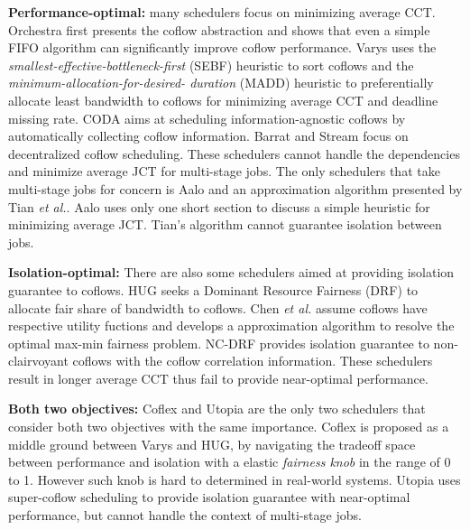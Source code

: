 \documentclass[10pt, conference, letterpaper]{IEEEtran}
\begin{document}
\noindent\textbf{Performance-optimal:} many schedulers focus on minimizing average CCT. Orchestra\cite{orchestra} first presents the coflow abstraction and shows that even a simple FIFO algorithm can significantly improve coflow performance. Varys\cite{varys} uses the \emph{smallest-effective-bottleneck-first} (SEBF) heuristic to sort coflows and the \emph{minimum-allocation-for-desired- duration} (MADD) heuristic to preferentially allocate least bandwidth to coflows for minimizing average CCT and deadline missing rate. CODA\cite{coda} aims at scheduling information-agnostic coflows by automatically collecting coflow information. Barrat\cite{barrat} and Stream\cite{stream} focus on decentralized coflow scheduling. These schedulers cannot handle the dependencies and minimize average JCT for multi-stage jobs. The only schedulers that take multi-stage jobs for concern is Aalo\cite{aalo} and an approximation algorithm presented by Tian \emph{et al.}\cite{bingchuan}. Aalo uses only one short section to discuss a simple heuristic for minimizing average JCT. Tian's algorithm cannot guarantee isolation between jobs.

\noindent\textbf{Isolation-optimal:} There are also some schedulers aimed at providing isolation guarantee to coflows. HUG\cite{HUG} seeks a Dominant Resource Fairness (DRF)\cite{DRF} to allocate fair share of bandwidth to coflows. Chen \emph{et al.}\cite{optimizing} assume coflows have respective utility fuctions and develops a approximation algorithm to resolve the optimal max-min fairness problem. NC-DRF\cite{fair} provides isolation guarantee to non-clairvoyant coflows with the coflow correlation information. These schedulers result in longer average CCT thus fail to provide near-optimal performance.

\noindent\textbf{Both two objectives:} Coflex\cite{coflex} and Utopia\cite{utopia} are the only two schedulers that consider both two objectives with the same importance. Coflex is proposed as a middle ground between Varys and HUG, by navigating the tradeoff space between performance and isolation with a elastic \emph{fairness knob} in the range of 0 to 1. However such knob is hard to determined in real-world systems. Utopia uses super-coflow scheduling to provide isolation guarantee with near-optimal performance, but cannot handle the context of multi-stage jobs.
\end{document}
